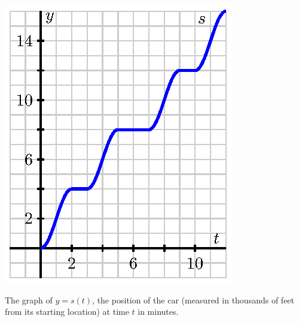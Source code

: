 \begin{marginfigure}[-18cm]
\includegraphics{figures/1_6_PA1.eps}
\caption{The graph of $y = s(t)$, the position of the car (measured in thousands of feet from its starting location) at time $t$ in minutes.} \label{fig:2.3.A1}
\end{marginfigure}


